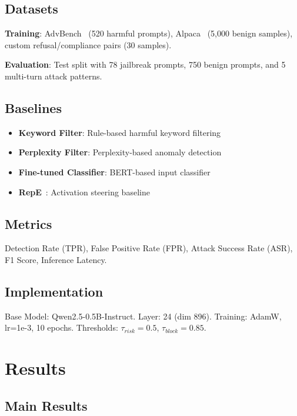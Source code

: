 \documentclass[10pt,twocolumn]{article}
\begin{document}
\subsection{Datasets}

\textbf{Training}: AdvBench~\cite{zou2023universal} (520 harmful prompts), Alpaca~\cite{taori2023stanford} (5,000 benign samples), custom refusal/compliance pairs (30 samples).

\textbf{Evaluation}: Test split with 78 jailbreak prompts, 750 benign prompts, and 5 multi-turn attack patterns.

\subsection{Baselines}

\begin{itemize}
\item \textbf{Keyword Filter}: Rule-based harmful keyword filtering
\item \textbf{Perplexity Filter}: Perplexity-based anomaly detection
\item \textbf{Fine-tuned Classifier}: BERT-based input classifier
\item \textbf{RepE}~\cite{zou2023representation}: Activation steering baseline
\end{itemize}

\subsection{Metrics}

Detection Rate (TPR), False Positive Rate (FPR), Attack Success Rate (ASR), F1 Score, Inference Latency.

\subsection{Implementation}

Base Model: Qwen2.5-0.5B-Instruct. Layer: 24 (dim 896). Training: AdamW, lr=1e-3, 10 epochs. Thresholds: $\tau_{risk}=0.5$, $\tau_{block}=0.85$.

\section{Results}

\subsection{Main Results}
\end{document}

